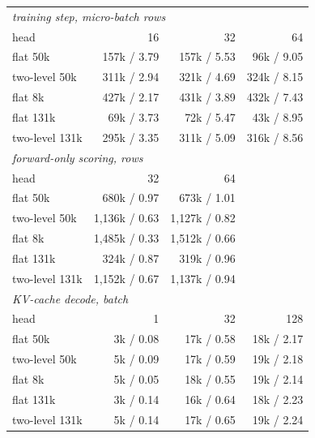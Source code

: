 \begin{tabular}{lrrr}
\toprule
\multicolumn{4}{l}{\textit{training step{,} micro-batch rows}} \\
head & 16 & 32 & 64 \\ \midrule
flat 50k & 157k / 3.79 & 157k / 5.53 & 96k / 9.05 \\
two-level 50k & 311k / 2.94 & 321k / 4.69 & 324k / 8.15 \\
flat 8k & 427k / 2.17 & 431k / 3.89 & 432k / 7.43 \\
flat 131k & 69k / 3.73 & 72k / 5.47 & 43k / 8.95 \\
two-level 131k & 295k / 3.35 & 311k / 5.09 & 316k / 8.56 \\
\midrule
\multicolumn{4}{l}{\textit{forward-only scoring{,} rows}} \\
head & 32 & 64 \\ \midrule
flat 50k & 680k / 0.97 & 673k / 1.01 \\
two-level 50k & 1{,}136k / 0.63 & 1{,}127k / 0.82 \\
flat 8k & 1{,}485k / 0.33 & 1{,}512k / 0.66 \\
flat 131k & 324k / 0.87 & 319k / 0.96 \\
two-level 131k & 1{,}152k / 0.67 & 1{,}137k / 0.94 \\
\midrule
\multicolumn{4}{l}{\textit{KV-cache decode{,} batch}} \\
head & 1 & 32 & 128 \\ \midrule
flat 50k & 3k / 0.08 & 17k / 0.58 & 18k / 2.17 \\
two-level 50k & 5k / 0.09 & 17k / 0.59 & 19k / 2.18 \\
flat 8k & 5k / 0.05 & 18k / 0.55 & 19k / 2.14 \\
flat 131k & 3k / 0.14 & 16k / 0.64 & 18k / 2.23 \\
two-level 131k & 5k / 0.14 & 17k / 0.65 & 19k / 2.24 \\
\bottomrule
\end{tabular}
